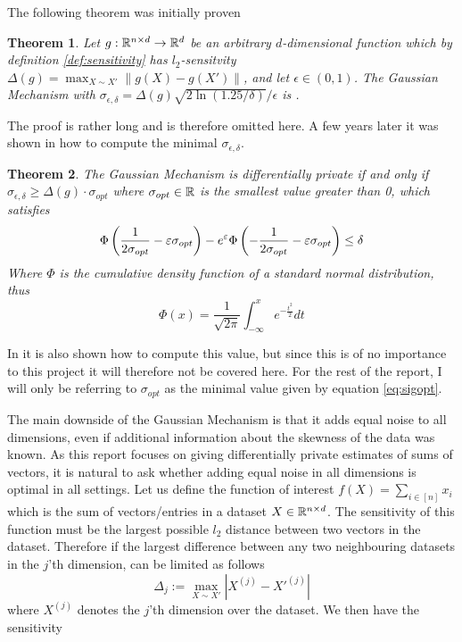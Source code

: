 \documentclass[a4paper,12pt]{article}
\newtheorem{theorem}{Theorem}
\begin{document}
The following theorem was initially proven
\begin{theorem}\textnormal{}
\label{theo:gaussMech}
Let $g: \mathbb{R}^{n \times d} \rightarrow \mathbb{R}^{d}$ be an arbitrary 
$d$-dimensional function which by definition \ref{def:sensitivity} has $l_2$-sensitvity 
$ \Delta(g) = \max_{X \sim X'} \| g(X) - g(X') \|$, 
and let $\epsilon \in (0,1)$.
The Gaussian Mechanism with
$\sigma_{\epsilon, \delta} = \Delta(g)  \sqrt{2\ln(1.25/\delta)}/\epsilon$ 
is \edp.
\end{theorem}
The proof is rather long and is therefore omitted here. A few years later it was shown in \cite{BalleWang} how to compute the minimal $\sigma_{\epsilon, \delta}$.

\begin{theorem}\textnormal{}
\label{theo:OptSig}
The Gaussian Mechanism is differentially private if and only if $\sigma_{\epsilon, \delta} \ge \Delta(g) \cdot \sigma_{opt}$ where
$\sigma_{opt} \in \mathbb{R}$ is the smallest value greater than 0, which satisfies
\begin{equation}
\label{eq:sigopt}
    \Phi \left (\frac{1}{2\sigma_{opt}} - \varepsilon\sigma_{opt}\right) - e^{\varepsilon} \Phi \left (-\frac{1}{2\sigma_{opt}} - \varepsilon\sigma_{opt}\right) \le \delta
\end{equation}
Where $\Phi$ is the cumulative density function of a standard normal distribution, thus
\[
    \Phi(x) = \frac{1}{\sqrt{2\pi}} \int_{-\infty}^{x} e^{-\frac{t^2}{2}} dt
\]
\end{theorem}
In \cite{BalleWang} it is also shown how to compute this value, but since this is of no importance to this project it will therefore not be covered here.
For the rest of the report, I will only be referring to $\sigma_{opt}$ as the minimal value given by equation \eqref{eq:sigopt}.

The main downside of the Gaussian Mechanism is that it adds equal noise to all dimensions, 
even if additional information about the skewness of the data was known.
As this report focuses on giving differentially private estimates of sums of vectors, it is natural to ask whether adding equal noise in all dimensions
is optimal in all settings. Let us define the function of interest $f(X) = \sum_{i \in [n]} x_i$ which is the sum of vectors/entries in a dataset $X \in \mathbb{R}^{n \times d}$. 
The sensitivity of this function must be the largest possible $l_2$ distance between two vectors in the dataset.
Therefore if the largest difference between any two neighbouring datasets 
in the $j$'th dimension, can be limited as follows
\begin{equation}
\label{eq:DimCon}
    \Delta_j := \max_{X \sim X'}|X^{(j)} - X'^{(j)}|
\end{equation}
where $X^{(j)}$ denotes the $j$'th dimension over the dataset.
We then have the sensitivity 
\end{document}
